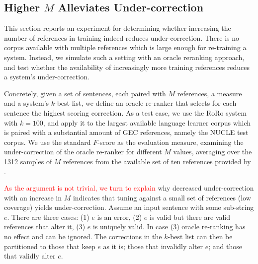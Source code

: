 \documentclass[11pt, a4paper]{article}
\begin{document}
\subsection{Higher $M$ Alleviates Under-correction}\label{subsec:reranking}

This section reports an experiment for determining whether increasing
the number of references in training indeed reduces under-correction. There is no 
corpus available with multiple references which is large enough for re-training a system. 
Instead, we simulate such a setting with an oracle reranking approach, and test whether the 
availability of increasingly more training references reduces a system's under-correction.

Concretely, given a set of sentences, each paired with $M$ references, a measure and a 
system's $k$-best list, we define an oracle re-ranker that selects for each sentence the highest scoring correction.
As a test case, we use the RoRo system with $k=100$, and apply it to the 
largest available language learner corpus which is paired with a substantial amount of GEC references,
namely the NUCLE test corpus. We use the standard $F$-score as the evaluation measure,
examining the under-correction of the oracle re-ranker for different $M$ values, averaging over the 1312 samples of 
$M$ references from the available set of ten references provided by \citet{bryant2015far}.

\textcolor{red}{As the argument is not trivial, we turn to explain }why decreased under-correction with an increase in $M$ indicates
that tuning against a small set of references (low coverage) yields under-correction. 
Assume an input sentence with some sub-string $e$. 
There are three cases: (1) $e$ is an error, (2) $e$ is valid but there are valid references that alter it, (3) $e$ is uniquely valid. In case (3) oracle re-ranking has no effect and can be ignored.
The corrections in the $k$-best list can then be partitioned to those that keep $e$ as it is; those that invalidly alter $e$; and those that validly alter $e$. 
\end{document}

